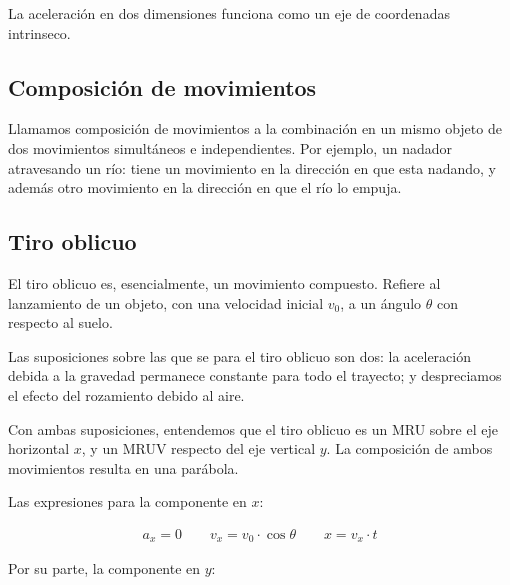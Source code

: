 La aceleración en dos dimensiones funciona como 
un eje de coordenadas intrinseco.

\subsection{Composición de movimientos}

Llamamos composición de movimientos a la combinación en un mismo objeto de 
dos movimientos simultáneos e independientes.
Por ejemplo, un nadador atravesando un río:
tiene un movimiento en la dirección en que esta nadando,
y además otro movimiento en la dirección en que el río lo empuja.

\subsection{Tiro oblicuo}

El tiro oblicuo es, esencialmente, un movimiento compuesto.
Refiere al lanzamiento de un objeto,
con una velocidad inicial \(v_0\),
a un ángulo \(\theta\) con respecto al suelo.

Las suposiciones sobre las que se para el tiro oblicuo son dos:
la aceleración debida a la gravedad permanece constante para todo el trayecto;
y despreciamos el efecto del rozamiento debido al aire.

Con ambas suposiciones,
entendemos que el tiro oblicuo es un MRU sobre el eje horizontal \(x\),
y un MRUV respecto del eje vertical \(y\).
La composición de ambos movimientos resulta en una parábola.

\vspace{.5cm}
\begin{center}
\end{center}
\vspace{.5cm}

Las expresiones para la componente en \(x\): 

\begin{align*}
    a_x = 0 \qquad v_x = v_0 \cdot \cos\theta \qquad x = v_x \cdot t 
\end{align*}

Por su parte, la componente en \(y\):

